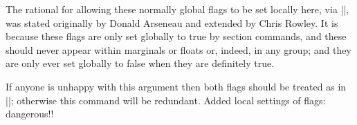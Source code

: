   \begin{macro}{\@floatboxreset}
    
 The rational for allowing these normally global flags to be set
 locally here, via |\@parboxrestore|, was stated originally by
 Donald Arseneau and extended by Chris Rowley.
 It is because these flags are only set globally to
 true by section commands, and these should never appear within
 marginals or floats or, indeed, in any group; and they are only ever
 set globally to false when they are definitely true.

 If anyone is unhappy with this argument then both flags should be
 treated as in |\set@nobreak|; otherwise this command will be
 redundant. 
     {Added local settings of flags: dangerous!!}
    \begin{teX}
\def \@floatboxreset {%
        \reset@font
        \normalsize
        \@setminipage
}
    \end{teX}
  \end{macro}
  
  \begin{macro}{\@setnobreak}
    \begin{teX}
\def \@setnobreak{%
  \if@nobreak
    \let\outer@nobreak\@nobreaktrue
    \@nobreakfalse
  \fi
}
    \end{teX}
  \end{macro}

  \begin{macro}{\@setminipage}
    \begin{teX}
\def \@setminipage{%
  \@minipagetrue
  \everypar{\@minipagefalse\everypar{}}%
}
    \end{teX}
  \end{macro}

 \begin{macro}{\end@float}
    \begin{teX}
\def\end@float{%
  \@endfloatbox
  \ifnum\@floatpenalty <\z@
    \end{teX}
 We make sure that we never exceed |\textheight|, otherwise float
 will never get typeset (91/03/15 FMi).
    \begin{teX}
    \@largefloatcheck
    \@cons\@currlist\@currbox
    \ifnum\@floatpenalty <-\@Mii
      \penalty -\@Miv
    \end{teX}
 Saving and restoring |\prevdepth| added 26 May 87 to prevent extra
 vertical space when used in vertical mode.
    \begin{teX}
      \@tempdima\prevdepth
      \vbox{}%
      \prevdepth\@tempdima
    \end{teX}

    \begin{teX}
      \penalty\@floatpenalty
    \end{teX}
 
    \begin{teX}
    \else
      \vadjust{\penalty -\@Miv \vbox{}\penalty\@floatpenalty}\@Esphack
    \fi
  \fi
}
    \end{teX}
 \end{macro}

